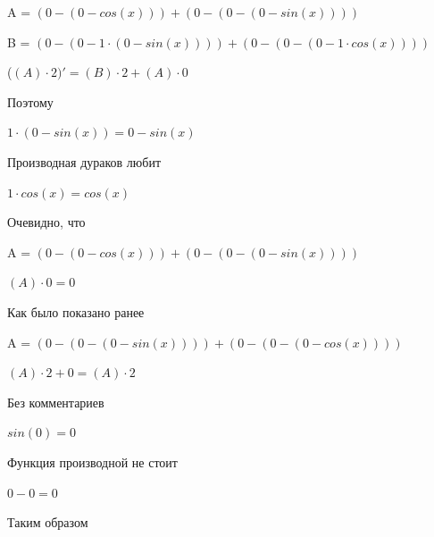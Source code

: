 \documentclass[12pt,a4paper,fleqn]{article}
\begin{document}
\begin{center}
\begin{center}
\begin{center}
\begin{center}
\begin{center}
\begin{center}
\begin{center}
\begin{center}
\begin{center}
\begin{center}
\begin{center}
\begin{center}
\begin{center}
\begin{center}
\begin{center}
\begin{center}
\begin{center}
\begin{center}
\begin{center}
\begin{center}
\begin{center}
\begin{center}
\begin{center}
\begin{center}
\begin{center}
\begin{center}
\begin{center}
\begin{center}
\begin{center}
\begin{center}
\begin{center}
\begin{center}
\begin{center}
\begin{center}
\begin{center}
\begin{center}
\begin{center}
\begin{center}
\begin{center}
\begin{center}
\begin{center}
\begin{center}
\begin{center}
\begin{center}
\begin{center}
A = $(0-(0-cos(x)))+(0-(0-(0-sin(x))))$\end{center}
\begin{center}
B = $(0-(0-1 \cdot (0-sin(x))))+(0-(0-(0-1 \cdot cos(x))))$\end{center}
\begin{center}
 ($(A) \cdot 2)'
  = (B) \cdot 2+(A) \cdot 0$\end{center}
Поэтому

\begin{center}
$1 \cdot (0-sin(x)) = 0-sin(x)$\end{center}
Производная дураков любит\cite{link2}

\begin{center}
$1 \cdot cos(x) = cos(x)$\end{center}
Очевидно, что

\begin{center}
A = $(0-(0-cos(x)))+(0-(0-(0-sin(x))))$\end{center}
\begin{center}
$(A) \cdot 0 = 0$\end{center}
Как было показано ранее

\begin{center}
A = $(0-(0-(0-sin(x))))+(0-(0-(0-cos(x))))$\end{center}
\begin{center}
$(A) \cdot 2+0 = (A) \cdot 2$\end{center}
Без комментариев\cite{link4}

\begin{center}
\begin{center}$sin(0) = 0$\end{center}
Функция производной не стоит\cite{link2}

\begin{center}
\begin{center}$0-0 = 0$\end{center}
Таким образом


\end{center}
\end{center}
\end{center}
\end{center}
\end{center}
\end{center}
\end{center}
\end{center}
\end{center}
\end{center}
\end{center}
\end{center}
\end{center}
\end{center}
\end{center}
\end{center}
\end{center}
\end{center}
\end{center}
\end{center}
\end{center}
\end{center}
\end{center}
\end{center}
\end{center}
\end{center}
\end{center}
\end{center}
\end{center}
\end{center}
\end{center}
\end{center}
\end{center}
\end{center}
\end{center}
\end{center}
\end{center}
\end{center}
\end{center}
\end{center}
\end{center}
\end{center}
\end{center}
\end{center}
\end{center}
\end{center}
\end{document}
